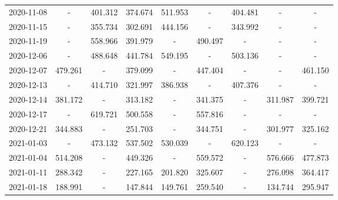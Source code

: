 \begin{table*}[t]
\begin{tabular}{ccccccccc}
2020-11-08 &        - &                        401.312 &  {\cellcolor{blue!25} 374.674} &                        511.953 &        - &  404.481 &                              - &        - \\
2020-11-15 &        - &                        355.734 &  {\cellcolor{blue!25} 302.691} &                        444.156 &        - &  343.992 &                              - &        - \\
2020-11-19 &        - &                        558.966 &  {\cellcolor{blue!25} 391.979} &                              - &  490.497 &        - &                              - &        - \\
2020-12-06 &        - &                        488.648 &  {\cellcolor{blue!25} 441.784} &                        549.195 &        - &  503.136 &                              - &        - \\
2020-12-07 &  479.261 &                              - &  {\cellcolor{blue!25} 379.099} &                              - &  447.404 &        - &                              - &  461.150 \\
2020-12-13 &        - &                        414.710 &  {\cellcolor{blue!25} 321.997} &                        386.938 &        - &  407.376 &                              - &        - \\
2020-12-14 &  381.172 &                              - &                        313.182 &                              - &  341.375 &        - &  {\cellcolor{blue!25} 311.987} &  399.721 \\
2020-12-17 &        - &                        619.721 &  {\cellcolor{blue!25} 500.558} &                              - &  557.816 &        - &                              - &        - \\
2020-12-21 &  344.883 &                              - &  {\cellcolor{blue!25} 251.703} &                              - &  344.751 &        - &                        301.977 &  325.162 \\
2021-01-03 &        - &  {\cellcolor{blue!25} 473.132} &                        537.502 &                        530.039 &        - &  620.123 &                              - &        - \\
2021-01-04 &  514.208 &                              - &  {\cellcolor{blue!25} 449.326} &                              - &  559.572 &        - &                        576.666 &  477.873 \\
2021-01-11 &  288.342 &                              - &                        227.165 &  {\cellcolor{blue!25} 201.820} &  325.607 &        - &                        276.098 &  364.417 \\
2021-01-18 &  188.991 &                              - &                        147.844 &                        149.761 &  259.540 &        - &  {\cellcolor{blue!25} 134.744} &  295.947 \\
\bottomrule
\end{tabular}

\end{table*}

